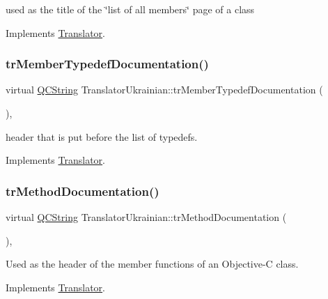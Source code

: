 used as the title of the \char`\"{}list of all members\char`\"{} page of a class 

Implements \mbox{\hyperlink{class_translator}{Translator}}.

\mbox{\label{class_translator_ukrainian_ac17e7cf29ae4791858d6a94ff4114bf6}} 
\subsubsection{\texorpdfstring{trMemberTypedefDocumentation()}{trMemberTypedefDocumentation()}}
{\footnotesize\ttfamily virtual \mbox{\hyperlink{class_q_c_string}{Q\+C\+String}} Translator\+Ukrainian\+::tr\+Member\+Typedef\+Documentation (\begin{DoxyParamCaption}{ }\end{DoxyParamCaption})\hspace{0.3cm}{\ttfamily [inline]}, {\ttfamily [virtual]}}

header that is put before the list of typedefs. 

Implements \mbox{\hyperlink{class_translator}{Translator}}.

\mbox{\label{class_translator_ukrainian_a8fffc63b4ecc05655aab521768bdcd2c}} 
\subsubsection{\texorpdfstring{trMethodDocumentation()}{trMethodDocumentation()}}
{\footnotesize\ttfamily virtual \mbox{\hyperlink{class_q_c_string}{Q\+C\+String}} Translator\+Ukrainian\+::tr\+Method\+Documentation (\begin{DoxyParamCaption}{ }\end{DoxyParamCaption})\hspace{0.3cm}{\ttfamily [inline]}, {\ttfamily [virtual]}}

Used as the header of the member functions of an Objective-\/C class. 

Implements \mbox{\hyperlink{class_translator}{Translator}}.

